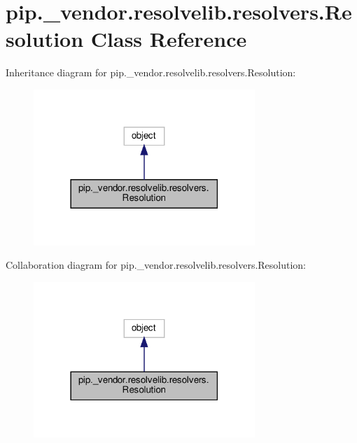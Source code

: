 \hypertarget{classpip_1_1__vendor_1_1resolvelib_1_1resolvers_1_1Resolution}{}\section{pip.\+\_\+vendor.\+resolvelib.\+resolvers.\+Resolution Class Reference}
\label{classpip_1_1__vendor_1_1resolvelib_1_1resolvers_1_1Resolution}


Inheritance diagram for pip.\+\_\+vendor.\+resolvelib.\+resolvers.\+Resolution\+:
\nopagebreak
\begin{figure}[H]
\begin{center}
\leavevmode
\includegraphics[width=237pt]{classpip_1_1__vendor_1_1resolvelib_1_1resolvers_1_1Resolution__inherit__graph}
\end{center}
\end{figure}


Collaboration diagram for pip.\+\_\+vendor.\+resolvelib.\+resolvers.\+Resolution\+:
\nopagebreak
\begin{figure}[H]
\begin{center}
\leavevmode
\includegraphics[width=237pt]{classpip_1_1__vendor_1_1resolvelib_1_1resolvers_1_1Resolution__coll__graph}
\end{center}
\end{figure}

